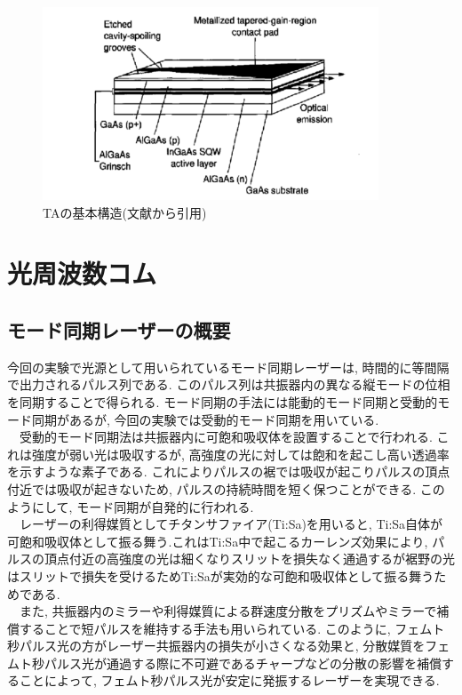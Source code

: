 \documentclass[uplatex, dvipdfmx, a4paper, report, papersize, 11pt]{jsbook}
\begin{document}
\begin{figure}[htbp]
 \begin{center}
  \includegraphics[width=100mm]{figures/chapter2/TA_structure.png}
 \end{center}
 \caption{TAの基本構造(文献\cite{Walpole1996}から引用)}
 \label{TA_structure}
\end{figure}


\section{光周波数コム}
\subsection{モード同期レーザーの概要}
今回の実験で光源として用いられているモード同期レーザーは, 時間的に等間隔で出力されるパルス列である. このパルス列は共振器内の異なる縦モードの位相を同期することで得られる. モード同期の手法には能動的モード同期と受動的モード同期があるが, 今回の実験では受動的モード同期を用いている.\\
　受動的モード同期法は共振器内に可飽和吸収体を設置することで行われる. これは強度が弱い光は吸収するが, 高強度の光に対しては飽和を起こし高い透過率を示すような素子である. これによりパルスの裾では吸収が起こりパルスの頂点付近では吸収が起きないため, パルスの持続時間を短く保つことができる. このようにして, モード同期が自発的に行われる.\\
　レーザーの利得媒質としてチタンサファイア(Ti:Sa)を用いると, Ti:Sa自体が可飽和吸収体として振る舞う.これはTi:Sa中で起こるカーレンズ効果により, パルスの頂点付近の高強度の光は細くなりスリットを損失なく通過するが裾野の光はスリットで損失を受けるためTi:Saが実効的な可飽和吸収体として振る舞うためである.\\
　また, 共振器内のミラーや利得媒質による群速度分散をプリズムやミラーで補償することで短パルスを維持する手法も用いられている. このように, フェムト秒パルス光の方がレーザー共振器内の損失が小さくなる効果と, 分散媒質をフェムト秒パルス光が通過する際に不可避であるチャープなどの分散の影響を補償することによって, フェムト秒パルス光が安定に発振するレーザーを実現できる.
\end{document}
